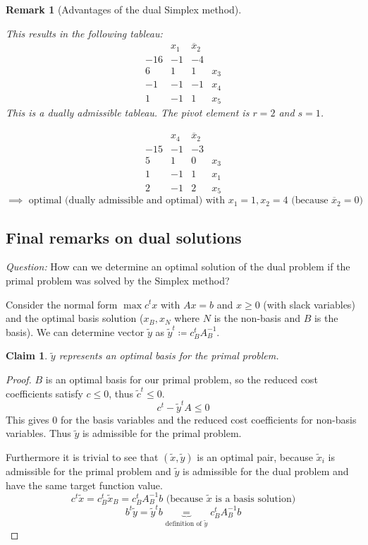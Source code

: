 \documentclass[a4paper]{article}
\numberwithin{lecref}{section}
\newtheorem*{Claim}{Claim}
\newtheorem*{Remark}{Remark}
\begin{document}
\begin{Remark}[Advantages of the dual Simplex method]
\begin{itemize}
			This results in the following tableau:
			\[\begin{array}{c|ccc}
				& x_1 & \overline x_2 & \\
				-16 & -1 & -4 & \\
				\hline
				6 & 1 & 1 & x_3 \\
				-1 & -1 & -1 & x_4 \\
				1 & -1 & 1 & x_5
			\end{array}\]
			This is a dually admissible tableau. The pivot element is $r=2$ and $s=1$.

			\[\begin{array}{c|ccc}
				& x_4 & \overline x_2 & \\
				-15 & -1 & -3 & \\
				\hline
				5 & 1 & 0 & x_3 \\
				1 & -1 & 1 & x_1 \\
				2 & -1 & 2 & x_5
			\end{array}\]
			\[ \implies \text{ optimal (dually admissible and optimal) with } x_1 = 1, x_2 = 4 \text{ (because $\overline x_2 = 0$)} \]
	\end{itemize}
\end{Remark}

\subsection{Final remarks on dual solutions}
\label{section:4.5}

\emph{Question:} How can we determine an optimal solution of the dual problem if the primal problem was solved by the Simplex method?

Consider the normal form $\max c^t x$ with $Ax = b$ and $x \geq 0$ (with slack variables) and the optimal basis solution ($x_B, x_N$ where $N$ is the non-basis and $B$ is the basis).
We can determine vector $\tilde y$ as $\tilde y^t \coloneqq c_B^t A_B^{-1}$.

\begin{Claim}
	$\tilde y$ represents an optimal basis for the primal problem.
\end{Claim}

\begin{proof}
	$B$ is an optimal basis for our primal problem, so the reduced cost coefficients satisfy $c \leq 0$, thus $\tilde c^t \leq 0$.
	\[ c^t - \tilde y^t A \leq 0 \]
	This gives $0$ for the basis variables and the reduced cost coefficients for non-basis variables.
	Thus $\tilde y$ is admissible for the primal problem.

	Furthermore it is trivial to see that $(\tilde x, \tilde y)$ is an optimal pair, because $\tilde x_i$ is admissible for the primal problem and $\tilde y$ is admissible for the dual problem and have the same target function value.
	\[ c^t \tilde x = c_B^t \tilde x_B = c_B^t A_B^{-1} b \text{ (because $\tilde x$ is a basis solution)} \]
	\[ b^t \tilde y = \tilde y^t b \underbrace{=}_{\text{definition of } \tilde y} c_B^t A_B^{-1} b \]
\end{proof}
\end{document}
